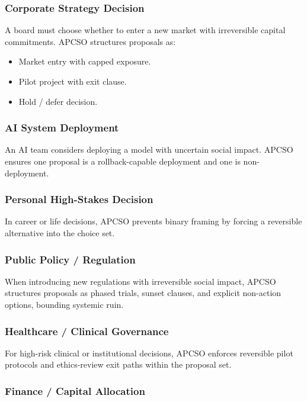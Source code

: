 \subsubsection{Corporate Strategy Decision}

A board must choose whether to enter a new market with irreversible
capital commitments. APCSO structures proposals as:

\begin{itemize}
\item Market entry with capped exposure.
\item Pilot project with exit clause.
\item Hold / defer decision.
\end{itemize}

\subsubsection{AI System Deployment}

An AI team considers deploying a model with uncertain social impact.
APCSO ensures one proposal is a rollback-capable deployment and one
is non-deployment.

\subsubsection{Personal High-Stakes Decision}

In career or life decisions, APCSO prevents binary framing by forcing
a reversible alternative into the choice set.

\subsubsection{Public Policy / Regulation}

When introducing new regulations with irreversible social impact,
APCSO structures proposals as phased trials, sunset clauses, and
explicit non-action options, bounding systemic ruin.

\subsubsection{Healthcare / Clinical Governance}

For high-risk clinical or institutional decisions, APCSO enforces
reversible pilot protocols and ethics-review exit paths within the
proposal set.

\subsubsection{Finance / Capital Allocation}

